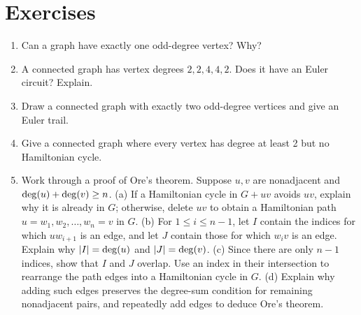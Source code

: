 \section*{Exercises}
\begin{enumerate}
\item Can a graph have exactly one odd-degree vertex? Why?
\item A connected graph has vertex degrees $2,2,4,4,2$. Does it have an Euler circuit? Explain.
\item Draw a connected graph with exactly two odd-degree vertices and give an Euler trail.
\item Give a connected graph where every vertex has degree at least 2 but no Hamiltonian cycle.
\item \Challenge{} Work through a proof of Ore's theorem. Suppose $u,v$ are nonadjacent and $\operatorname{deg}(u)+\operatorname{deg}(v)\geq n$. (a) If a Hamiltonian cycle in $G+uv$ avoids $uv$, explain why it is already in $G$; otherwise, delete $uv$ to obtain a Hamiltonian path $u=w_1,w_2,\ldots,w_n=v$ in $G$. (b) For $1\leq i\leq n-1$, let $I$ contain the indices for which $uw_{i+1}$ is an edge, and let $J$ contain those for which $w_iv$ is an edge. Explain why $|I|=\operatorname{deg}(u)$ and $|J|=\operatorname{deg}(v)$. (c) Since there are only $n-1$ indices, show that $I$ and $J$ overlap. Use an index in their intersection to rearrange the path edges into a Hamiltonian cycle in $G$. (d) Explain why adding such edges preserves the degree-sum condition for remaining nonadjacent pairs, and repeatedly add edges to deduce Ore's theorem.
\end{enumerate}
